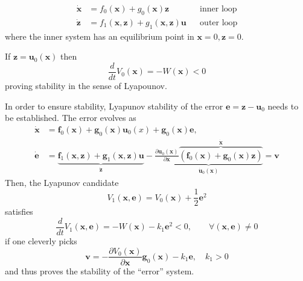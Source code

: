 \noindent\begin{align*}
    \dot{\mathbf{x}} & = f_0(\mathbf{x}) + g_0(\mathbf{x})\mathbf{z}                         &  & \text{inner loop} \\
    \dot{\mathbf{z}} & = f_1(\mathbf{x},\mathbf{z}) + g_1(\mathbf{x}, \mathbf{z}) \mathbf{u} &  & \text{outer loop}
\end{align*}
where the inner system has an equilibrium point in $\mathbf{x}=0, \mathbf{z}=0$.

\newpar{}
If $\mathbf{z} = \mathbf{u}_0(\mathbf{x})$ then
\noindent\begin{equation*}
    \frac{d}{dt} V_0(\mathbf{x}) = -W(\mathbf{x}) < 0
\end{equation*}
proving stability in the sense of Lyapounov.

\newpar{}

In order to ensure stability, Lyapunov stability of the error $\mathbf{e} = \mathbf{z}-\mathbf{u}_0$ needs to be established.
The error evolves as
\begin{align*}
    \dot{\mathbf{x}} & =\mathbf{f}_{0}(\mathbf{x})+\mathbf{g}_{0}(\mathbf{x})\mathbf{u}_{0}(x)+\mathbf{g}_{0}(\mathbf{x})\mathbf{e},                                                                                                                                                                                                                                              \\
    \dot{\mathbf{e}} & =\underbrace{\mathbf{f}_{1}(\mathbf{x},\mathbf{z})+\mathbf{g}_{1}(\mathbf{x},\mathbf{z})\mathbf{u}}_{\dot{\mathbf{z}}}-\underbrace{\frac{\partial \mathbf{u}_{0}(\mathbf{x})}{\partial \mathbf{x}}\overbrace{\left(\mathbf{f}_{0}(\mathbf{x})+\mathbf{g}_{0}(\mathbf{x})\mathbf{z}\right)}^{\dot{\mathbf{x}}}}_{\dot{\mathbf{u}}_0(\mathbf{x})}=\mathbf{v}
\end{align*}
Then, the Lyapunov candidate
\noindent\begin{equation*}
    V_1(\mathbf{x}, \mathbf{e}) = V_0(\mathbf{x})+\frac{1}{2} \mathbf{e}^2
\end{equation*}
satisfies
\noindent\begin{equation*}
    \frac{d}{dt}V_1(\mathbf{x}, \mathbf{e}) = -W(\mathbf{x}) - k_1 \mathbf{e}^2 <0 ,\qquad \forall(\mathbf{x},\mathbf{e}) \neq 0
\end{equation*}
if one cleverly picks
\begin{equation*}
    \mathbf{v}=-\frac{\partial V_0(\mathbf{x})}{\partial \mathbf{x}}\mathbf{g}_0(\mathbf{x})-k_1\mathbf{e},\quad k_1>0
\end{equation*}
and thus proves the stability of the ``error'' system.

